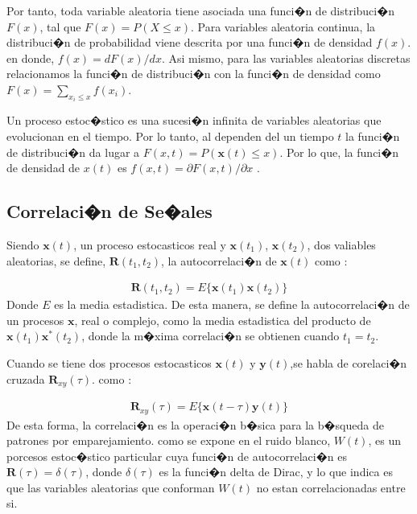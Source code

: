 Por tanto, toda variable aleatoria tiene asociada una funci�n de distribuci�n
${F(x)}$, tal que ${F(x)=P(X \leq x)}$. Para variables aleatoria continua, la
distribuci�n de probabilidad viene descrita por una funci�n de densidad
${f(x)}$. en donde, ${f(x)= dF(x)/dx}$. Asi mismo,  para las variables
aleatorias discretas relacionamos la funci�n de distribuci�n con la funci�n de
densidad como ${F(x)= \displaystyle\sum_{x_i \leq x }f(x_i)}$.

Un proceso estoc�stico es una sucesi�n infinita de variables aleatorias que
evolucionan en el tiempo. Por lo tanto, al dependen del un tiempo $t$  la
funci�n de distribuci�n da lugar a ${F(x,t)=P(\mathbf{x}(t) \leq x)}$.
Por lo que, la funci�n de densidad de $x(t)$ es $f(x,t)=
\partial{F(x,t)}/\partial{x}$ \cite{Papoulis91}.



\subsection{Correlaci�n de Se�ales}\label{subs:corresignal}
Siendo $\mathbf{x}(t)$, un proceso estocasticos real y $\mathbf{x}(t_1)$,
$\mathbf{x}(t_2)$, dos valiables aleatorias, se define, $\mathbf{R}(t_1,t_2)$,
la autocorrelaci�n de $\mathbf{x}(t)$ como \cite{Papoulis91}:

\begin{eqnarray}\label{eq:autocorrelation}
	\mathbf{R}(t_1,t_2)=E{\{ \mathbf{x}(t_1)\mathbf{x}(t_2) \}}
\end{eqnarray}
Donde $E$ es la media estadistica. De esta manera, se define la autocorrelaci�n
de un procesos $\mathbf{x}$, real o complejo, como la media estadistica del
producto de $\mathbf{x}(t_1)\mathbf{x}^*(t_2)$, donde la m�xima correlaci�n se
obtienen cuando $t_1=t_2$.

Cuando se tiene dos procesos estocasticos $\mathbf{x}(t)$ y
$\mathbf{y}(t)$,se habla de corelaci�n cruzada $\mathbf{R}_{xy}(\tau)$. como 
\cite{Requena08}:

\begin{eqnarray}\label{eq:correlation}
	\mathbf{R}_{xy}(\tau)=E{\{ \mathbf{x}(t-\tau)\mathbf{y}(t) \}}
\end{eqnarray}
De esta forma, la correlaci�n es la operaci�n b�sica para la b�squeda de
patrones por emparejamiento. como se expone en \cite{Requena08} el ruido blanco,
$W(t)$, es un porcesos estoc�stico particular cuya funci�n de autocorrelaci�n es
$\mathbf{R}(\tau)= \delta(\tau)$, donde $\delta(\tau)$ es la funci�n delta de
Dirac, y lo que indica es que las variables aleatorias que conforman $W(t)$
no estan correlacionadas entre si.


